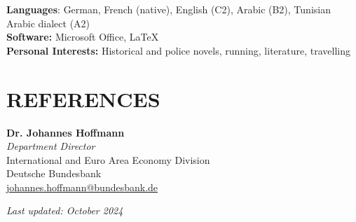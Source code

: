 \documentclass[a4paper,9pt]{extarticle}
\begin{document}
\noindent
\textbf{Languages}: German, French (native), English (C2), Arabic (B2), Tunisian Arabic dialect (A2) \\
\noindent
\textbf{Software:}  Microsoft Office, \LaTeX \\
\noindent
\textbf{Personal Interests:} Historical and police novels, running, literature, travelling  



\section*{REFERENCES}

\noindent
\textbf{Dr. Johannes Hoffmann} \\
\textit{Department Director} \\
International and Euro Area Economy Division \\
Deutsche Bundesbank \\
\href{mailto:johannes.hoffmann@bundesbank.de}{johannes.hoffmann@bundesbank.de} 

\begin{FlushRight}
        \textit{Last updated: October 2024}
\end{FlushRight}

\end{document}
